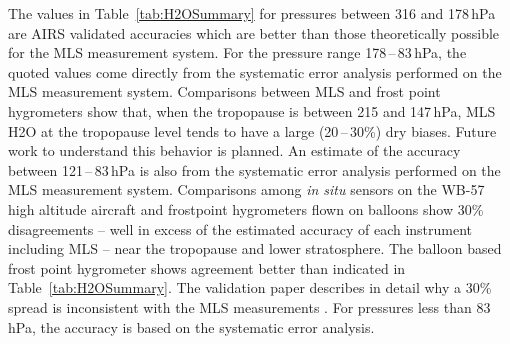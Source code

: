 \documentclass[11pt,draft]{report}
\begin{document}
The values in Table~\ref{tab:H2OSummary} for pressures between 316 and
178\,hPa are AIRS validated accuracies which are better than those
theoretically possible for the MLS measurement system. For the pressure
range 178\,--\,83\,hPa, the quoted values come directly from the
systematic error analysis performed on the MLS measurement
system. Comparisons between MLS and frost point hygrometers show that,
when the tropopause is between 215 and 147\,hPa, MLS H\cs2O at the
tropopause level tends to have a large (20\,--\,30\%) dry biases.
Future work to understand this behavior is planned.  An estimate of the
accuracy between 121\,--\,83\,hPa is also from the systematic error
analysis performed on the MLS measurement system.  Comparisons among
\emph{in situ} sensors on the WB-57 high altitude aircraft and
frostpoint hygrometers flown on balloons show 30\% disagreements -- well
in excess of the estimated accuracy of each instrument including MLS --
near the tropopause and lower stratosphere.  The balloon based frost
point hygrometer shows agreement better than indicated in
Table~\ref{tab:H2OSummary}. The validation paper describes in detail why
a 30\% spread is inconsistent with the MLS measurements
\citep{ReadEtal07}.  For pressures less than 83\,hPa, the accuracy is
based on the systematic error analysis.
\end{document}
